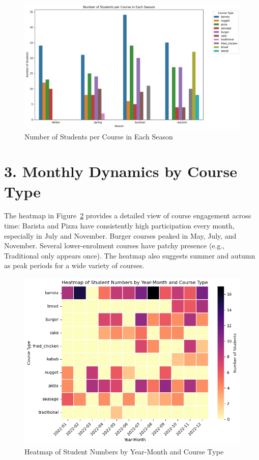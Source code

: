 \documentclass[12pt,a4paper]{article}
\begin{document}
\begin{figure}[h!]
    \centering
    \includegraphics[width=1\textwidth]{Number of Students per Course in Each Season.png}
    \caption{Number of Students per Course in Each Season}
    \label{fig:seasonal-courses}
\end{figure}

\section*{3. Monthly Dynamics by Course Type}
The heatmap in Figure~\ref{fig:heatmap-course-month} provides a detailed view of course engagement across time:  
Barista and Pizza have consistently high participation every month, especially in July and November.  
Burger courses peaked in May, July, and November.  
Several lower-enrolment courses have patchy presence (e.g., Traditional only appears once).  
The heatmap also suggests summer and autumn as peak periods for a wide variety of courses.

\begin{figure}[h!]
    \centering
    \includegraphics[width=1\textwidth]{Heatmap of Student Numbers by Year-Month and Course Type.png}
    \caption{Heatmap of Student Numbers by Year-Month and Course Type}
    \label{fig:heatmap-course-month}
\end{figure}
\end{document}
